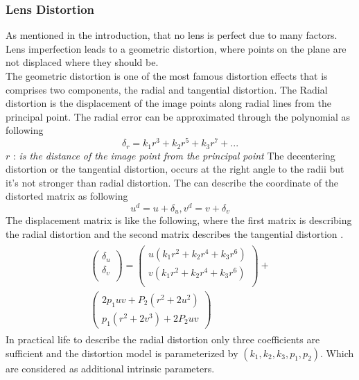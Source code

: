 \documentclass[journal,final,a4paper,twoside]{PS}
\begin{document}
\subsubsection{Lens Distortion}
As mentioned in the introduction, that no lens is perfect due to many factors. Lens imperfection leads to a geometric distortion, where points on the plane are not displaced where they should be.
\\
The geometric distortion is one of the most famous distortion effects that is comprises two components, the radial and tangential distortion. The Radial distortion is the displacement of the image points along radial lines from the principal point. The radial error can be approximated through the polynomial as following 
\begin{equation}
\delta_r=k_1r^3+k_2r^5+k_3r^7+...
\end{equation}
$r$ : \textit{is the distance of the image point from the principal point}
The decentering distortion or the tangential distortion, occurs at the right angle to the radii but it's not stronger than radial distortion.
The can describe the coordinate of the distorted matrix as following 
\begin{equation}
u^d = u+\delta_u,v^d=v+\delta_v
\end{equation}
The displacement matrix is like the following, where the first matrix is describing the radial distortion and the second matrix describes the tangential distortion \cite{Corke}.
\begin{align}
\begin{split}
\begin{pmatrix}
\delta_u\\
\delta_v\\
\end{pmatrix}=\begin{pmatrix}
u(k_1r^2+k_2r^4+k_3r^6)\\
v(k_1r^2+k_2r^4+k_3r^6)\\
\end{pmatrix}+\\
\begin{pmatrix}
2p_1uv+P_2(r^2+2u^2)\\
p_1(r^2+2v^3)+2P_2uv
\end{pmatrix}
\end{split}
\end{align}
In practical life to describe the radial distortion only three coefficients are sufficient and the distortion model is parameterized by $(k_1,k_2,k_3,p_1,p_2)$. Which are considered as additional intrinsic parameters.
\end{document}
